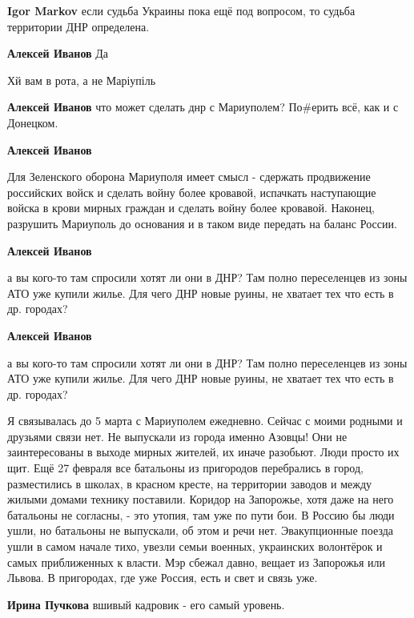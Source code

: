 \begin{itemize}
\begin{itemize}
\textbf{Igor Markov} если судьба Украины пока ещё под вопросом, то судьба территории ДНР определена.

\textbf{Алексей Иванов} Да

Хй вам в рота, а не Маріупіль

\textbf{Алексей Иванов} что может сделать днр с Мариуполем? По\#ерить всё, как и с Донецком.

\textbf{Алексей Иванов} 

Для Зеленского оборона Мариуполя имеет смысл - сдержать продвижение российских
войск и сделать войну более кровавой, испачкать наступающие войска в крови
мирных граждан и сделать войну более кровавой. Наконец, разрушить Мариуполь до
основания и в таком виде передать на баланс России.

\textbf{Алексей Иванов} 

а вы кого-то там спросили хотят ли они в ДНР? Там полно переселенцев из зоны
АТО уже купили жилье. Для чего ДНР новые руины, не хватает тех что есть в др.
городах?

\textbf{Алексей Иванов} 

а вы кого-то там спросили хотят ли они в ДНР? Там полно переселенцев из зоны
АТО уже купили жилье. Для чего ДНР новые руины, не хватает тех что есть в др.
городах?

\end{itemize} %


Я связывалась до 5 марта с Мариуполем ежедневно. Сейчас с моими родными и
друзьями связи нет. Не выпускали из города именно Азовцы! Они не заинтересованы
в выходе мирных жителей, их иначе разобьют. Люди просто их щит. Ещё 27 февраля
все батальоны из пригородов перебрались в город, разместились в школах, в
красном кресте, на территории заводов и между жилыми домами технику поставили.
Коридор на Запорожье, хотя даже на него батальоны не согласны, - это утопия,
там уже по пути бои. В Россию бы люди ушли, но батальоны не выпускали, об этом
и речи нет. Эвакупционные поезда ушли в самом начале тихо, увезли семьи
военных, украинских волонтёрок и самых приближенных к власти. Мэр сбежал давно,
вещает из Запорожья или Львова. В пригородах, где уже Россия, есть и свет и
связь уже.

\begin{itemize} %
\textbf{Ирина Пучкова} вшивый кадровик - его самый уровень.


\end{itemize}
\end{itemize}
